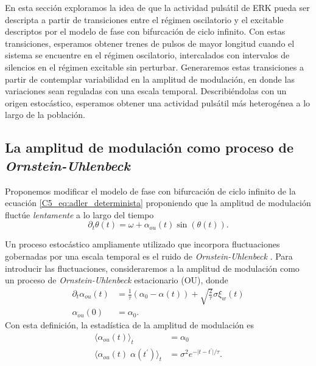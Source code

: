 \documentclass[./main.tex]{subfiles}
\begin{document}
En esta sección exploramos la idea de que la actividad pulsátil de ERK pueda ser descripta a partir de transiciones entre el régimen oscilatorio y el excitable descriptos por el modelo de fase con bifurcación de ciclo infinito. Con estas transiciones, esperamos obtener trenes de pulsos de mayor longitud cuando el sistema se encuentre en el régimen oscilatorio, intercalados con intervalos de silencios en el régimen excitable sin perturbar. Generaremos estas transiciones a partir de contemplar variabilidad en la amplitud de modulación, en donde las variaciones sean reguladas con una escala temporal. Describiéndolas con un origen estocástico, esperamos obtener una actividad pulsátil más heterogénea a lo largo de la población. 


\subsection{La amplitud de modulación como proceso de \textit{Ornstein-Uhlenbeck}}

Proponemos modificar el modelo de fase con bifurcación de ciclo infinito de la ecuación \ref{C5_eq:adler_determinista} proponiendo que la amplitud de modulación fluctúe \emph{lentamente} a lo largo del tiempo
\begin{equation}
    \partial_t  \theta(t) = \omega + \alpha_{ou}(t) \sin{(\theta(t))}.
    \label{C7_eq:alpha_ou}
\end{equation}

Un proceso estocástico ampliamente utilizado que incorpora fluctuaciones gobernadas por una escala temporal es el ruido de \textit{Ornstein-Uhlenbeck} \cite{SanMiguel2000}. Para introducir las fluctuaciones, consideraremos a la amplitud de modulación como un proceso de \textit{Ornstein-Uhlenbeck} estacionario (OU), donde 
\begin{align}
    \partial_t  \alpha_{ou}(t) &= \frac{1}{\tau} (\alpha_0 - \alpha(t)) + \sqrt{\frac{2}{\tau}}\sigma \xi_w(t) \label{C7_eq:OU_langevin}\\
    \alpha_{ou}(0) &= \alpha_0.
\end{align}
Con esta definición, la estadística de la amplitud de modulación es
\begin{align}
    \langle \alpha_{ou}(t) \rangle_t &= \alpha_0 \\
    \langle \alpha_{ou}(t) \; \alpha(t^\prime) \rangle_t &= \sigma^2 e^{- \lvert t-t^\prime \rvert / \tau } \label{C7_eq:OU_corr}.
\end{align}
\end{document}
